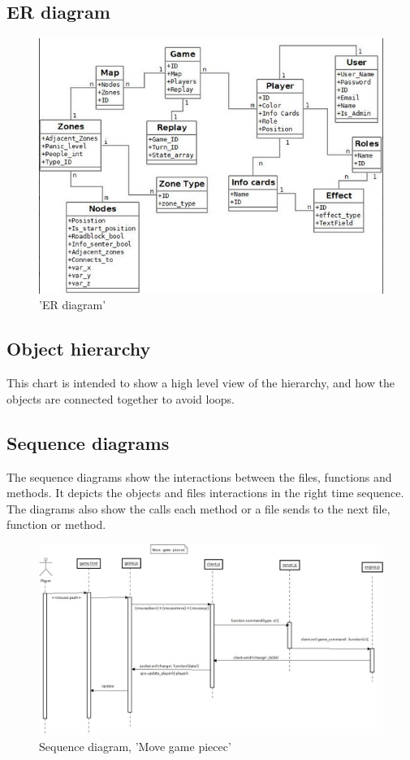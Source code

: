 \subsection{ER diagram}
\begin{figure}[H]
  \centering
    \includegraphics[width=1.0\textwidth]{img/erdiagram.png}
  \caption{'ER diagram'} 
  \label{fig:erdiagram}
\end{figure}

\subsection{Object hierarchy}
This chart is intended to show a high level view of the hierarchy, and how the objects are connected together to avoid loops. 

\subsection{Sequence diagrams}

The sequence diagrams show the interactions between the files, functions and methods. It depicts the objects and files interactions in the right time sequence. The diagrams also show the calls each method or a file sends to the next file, function or method.  \\


\begin{figure}[H]
  \centering
    \includegraphics[width=1.0\textwidth]{img/movegamepiececsekvensdiagram.jpeg}
  \caption{Sequence diagram, 'Move game piecec'} 
  \label{fig:movegamepieceseq}
\end{figure}

